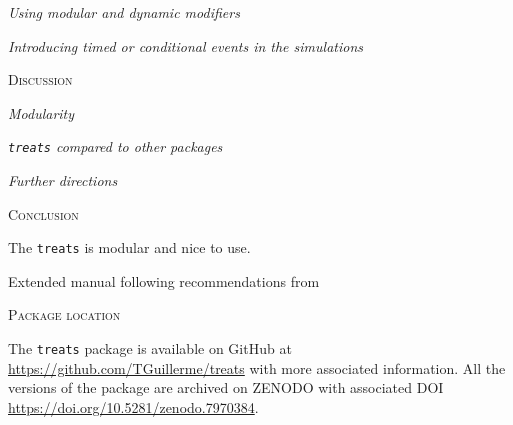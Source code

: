 \documentclass[12pt,letterpaper]{article}
\renewcommand{\section}[1]{%
\bigskip
\begin{center}
\begin{Large}
\normalfont\scshape #1
\medskip
\end{Large}
\end{center}}
\renewcommand{\subsection}[1]{%
\bigskip
\begin{center}
\begin{large}
\normalfont\itshape #1
\end{large}
\end{center}}
\newcommand{\treats}{\texttt{treats} }
\begin{document}





\subsection{Using modular and dynamic modifiers}


\subsection{Introducing timed or conditional events in the simulations}


\section{Discussion}

\subsection{Modularity}

\subsection{\treats compared to other packages}

\subsection{Further directions}


\section{Conclusion}
The \treats is modular and nice to use.

Extended manual following recommendations from \cite{cooper2016dark}


\section{Package location}
The \treats package is available 
on GitHub at \url{https://github.com/TGuillerme/treats} with more associated information.
All the versions of the package are archived on ZENODO with associated DOI \url{https://doi.org/10.5281/zenodo.7970384}.
\end{document}

